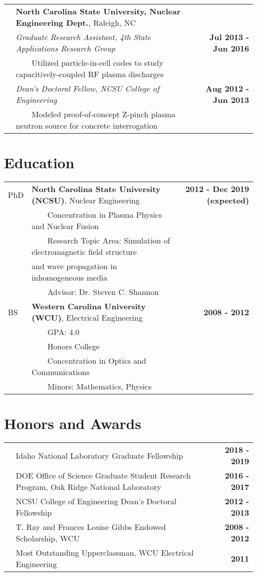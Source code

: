 \documentclass{article}
\newcommand{\tabitem}{~~\textbullet~~}
\begin{document}
\begin{tabularx}{\textwidth}{l X r}
	& \textbf{North Carolina State University, Nuclear Engineering Dept.}, Raleigh, NC & \\
	& \textit{Graduate Research Assistant, 4th State Applications Research Group} & \textbf{Jul 2013 - Jun 2016} \\
	& \tabitem Utilized particle-in-cell codes to study capacitively-coupled RF plasma discharges & \\
	& \textit{Dean's Doctoral Fellow, NCSU College of Engineering} & \textbf{Aug 2012 - Jun 2013} \\
	& \tabitem Modeled proof-of-concept Z-pinch plasma neutron source for concrete interrogation & \\
\end{tabularx}

\section*{Education}

	\begin{tabularx}{\textwidth}{l X r}
	PhD 		 & \textbf{North Carolina State University (NCSU)}, Nuclear Engineering &  \textbf{2012 - Dec 2019 (expected)} \\
				 & \tabitem Concentration in Plasma Physics and Nuclear Fusion & \\
				 & \tabitem Research Topic Area: Simulation of electromagnetic field structure & \\
				 & \hspace{1.5em} and wave propagation in inhomogeneous media & \\
				 & \tabitem Advisor: Dr. Steven C. Shannon & \\
	BS			 & \textbf{Western Carolina University (WCU)}, Electrical Engineering  & \textbf{2008 - 2012} \\
				 & \tabitem GPA: 4.0 & \\
				 & \tabitem Honors College & \\
				 & \tabitem Concentration in Optics and Communications & \\
				 & \tabitem Minors: Mathematics, Physics &
	\end{tabularx}

\section*{Honors and Awards}

	\begin{tabularx}{\textwidth}{l X r}
		\hspace{2em} & Idaho National Laboratory Graduate Fellowship & \textbf{2018 - 2019} \\
					 & DOE Office of Science Graduate Student Research Program, Oak Ridge National Laboratory & \textbf{2016 - 2017} \\
					 & NCSU College of Engineering Dean's Doctoral Fellowship & \textbf{2012 - 2013} \\
					 & T. Ray and Frances Louise Gibbs Endowed Scholarship, WCU & \textbf{2008 - 2012} \\
					 & Most Outstanding Upperclassman, WCU Electrical Engineering & \textbf{2011}
	\end{tabularx}
\end{document}
